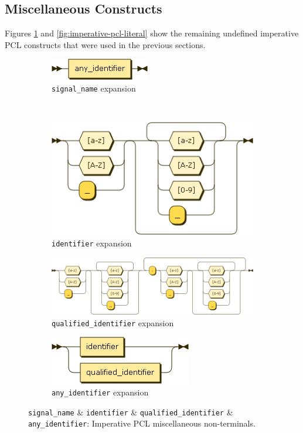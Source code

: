 \subsection{Miscellaneous Constructs}
Figures \ref{fig:imperative-pcl-misc} and \ref{fig:imperative-pcl-literal} show the remaining undefined imperative PCL constructs that were used in the previous sections.
\begin{figure}[h!]
  \centering
 \begin{subfigure}[b]{0.4\textwidth}
    \includegraphics[scale=\DiagramScale]{chapters/adapter/diagrams/signal_name}
    \caption{\texttt{signal\_name} expansion}
  \end{subfigure}
  ~
  \begin{subfigure}[b]{0.4\textwidth}
    \includegraphics[scale=\DiagramScale]{chapters/adapter/diagrams/identifier}
    \caption{\texttt{identifier} expansion}
  \end{subfigure}
  
  \begin{subfigure}[b]{0.9\textwidth}
    \includegraphics[scale=0.5]{chapters/adapter/diagrams/qualified_identifier}
    \caption{\texttt{qualified\_identifier} expansion}
  \end{subfigure}

   \begin{subfigure}[b]{0.4\textwidth}
    \includegraphics[scale=\DiagramScale]{chapters/adapter/diagrams/any_identifier}
    \caption{\texttt{any\_identifier} expansion}
  \end{subfigure}
  \caption{\texttt{signal\_name} \& \texttt{identifier} \& \texttt{qualified\_identifier} \& \texttt{any\_identifier}: Imperative PCL miscellaneous non-terminals.}
  \label{fig:imperative-pcl-misc}
\end{figure}
